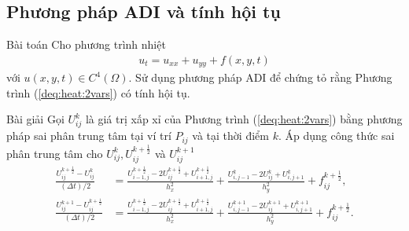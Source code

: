 \documentclass[9pt]{beamer}
\numberwithin{equation}{section}
\begin{document}
\subsection{Phương pháp ADI và tính hội tụ}

\begin{frame}
\begin{block}{Bài toán}
Cho phương trình nhiệt
\begin{align}
    u_t = u_{xx} + u_{yy} + f(x,y,t) \label{deq:heat:2vars}
\end{align}
với $u(x,y,t) \in C^4(\Omega)$. Sử dụng phương pháp ADI để chứng tỏ rằng Phương trình (\ref{deq:heat:2vars}) có tính hội tụ.
\end{block}

\begin{exampleblock}{Bài giải}
    Gọi $U_{ij}^k$ là giá trị xấp xỉ của Phương trình (\ref{deq:heat:2vars}) bằng phương pháp sai phân trung tâm tại ví trí $P_{ij}$ và tại thời điểm $k$. Áp dụng công thức sai phân trung tâm cho $U_{ij}^{k}, U_{ij}^{k + \frac{1}{2}}$ và $ U_{ij}^{k+1}$
    \begin{align*}
        \frac{U_{ij}^{k+\frac{1}{2}} - U_{ij}^k}{(\Delta t)/2} &=
        \frac{U_{i-1,j}^{k+\frac{1}{2}} - 2U_{ij}^{k+\frac{1}{2}} + U_{i+1,j}^{k+\frac{1}{2}}}{h_x^2} + \frac{U_{i,j-1}^k - 2U_{ij}^k + U_{i,j+1}^k}{h_y^2} + f_{ij}^{k+\frac{1}{2}}, \\
        \frac{U_{ij}^{k+1} - U_{ij}^{k+\frac{1}{2}}}{(\Delta t)/2} &=
        \frac{U_{i-1,j}^{k+\frac{1}{2}} - 2U_{ij}^{k+\frac{1}{2}} + U_{i+1,j}^{k+\frac{1}{2}}}{h_x^2} + \frac{U_{i,j-1}^{k+1} - 2U_{ij}^{k+1} + U_{i,j+1}^{k+1}}{h_y^2} + f_{ij}^{k+\frac{1}{2}}.
    \end{align*}
\end{exampleblock}
\end{frame}
\end{document}
